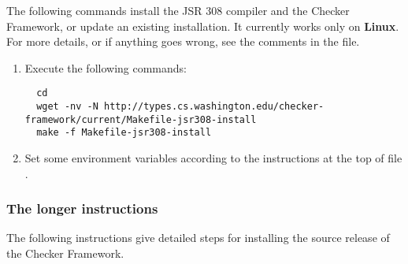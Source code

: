 
The following commands install
the JSR 308  compiler and the Checker
Framework, or update an existing installation.
It currently works only on \textbf{Linux}.
For more details, or if anything goes wrong, see the comments in the 
 file.

\begin{enumerate}

\item
  Execute the following commands:

\begin{Verbatim}
  cd
  wget -nv -N http://types.cs.washington.edu/checker-framework/current/Makefile-jsr308-install
  make -f Makefile-jsr308-install
\end{Verbatim}

\item
Set some environment variables according to the instructions at the top of file
.

\end{enumerate}


\subsubsection{The longer instructions}

The following instructions give detailed steps for installing the source
release of the Checker Framework.

